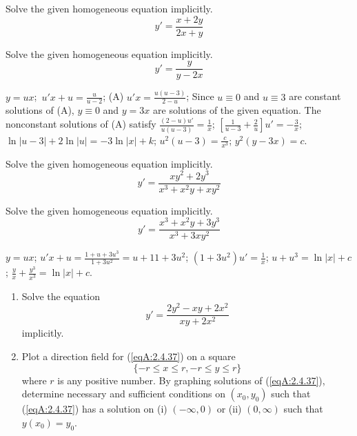\documentclass{ximera}
\begin{document}
\begin{problem}\label{exer:2.4.31}  Solve the given homogeneous equation implicitly.
$$y'=\frac{x+2y}{2x+y}$$
\end{problem}

\begin{problem}\label{exer:2.4.32}  Solve the given homogeneous equation implicitly.
$$y'=\frac{y}{y-2x}$$



\begin{solution}
    $y=ux$;\ $u'x+u=\frac{u}{ u-2}$;\;
(A)  $u'x=\frac{u(u-3)}{2-u}$;\;
Since $u\equiv0$ and $u\equiv3$
are constant solutions of (A), $y\equiv0$ and
$y=3x$ are solutions of the given equation.
The nonconstant solutions of (A) satisfy
$\frac{(2-u)u'}{ u(u-3)}=\frac{1}{ x}$;\;
$\left[\frac{1}{ u-3}+\frac{2}{
u}\right]u'=-\frac{3}{ x}$;\;
$\ln|u-3|+2\ln|u|=-3\ln|x|+k$;\;
$u^2(u-3)=\frac{c}{ x^3}$;\;
$y^2(y-3x)=c$.
\end{solution}
\end{problem}

\begin{problem}\label{exer:2.4.33} Solve the given homogeneous equation implicitly.
$$y'=\frac{xy^2+2y^3}{x^3+x^2y+xy^2}$$
\end{problem}

\begin{problem}\label{exer:2.4.34} Solve the given homogeneous equation implicitly.
$$y'=\frac{x^3+x^2y+3y^3}{x^3+3xy^2}$$



\begin{solution}
    $y=ux$;\;
$u'x+u=
\frac {1+u+3u^3 }{ 1+3u^2}=u+{1 }{ 1+3u^2}$;\;
$(1+3u^2)u'=\frac{1}{ x}$;\;
$u+u^3=\ln |x|+c$;\;
$\frac{y}{ x}+\frac{y^3}{ x^3}=\ln |x|+c$.
\end{solution}
\end{problem}


\begin{problem}\label{exer:2.4.37}
\begin{enumerate}
\item %
Solve the equation
\begin{equation}\label{eqA:2.4.37}
y'=\frac{2y^2-xy+2x^2}{xy+2x^2}
\end{equation}
implicitly.
\item %
Plot a direction field for (\ref{eqA:2.4.37}) on a square
$$
\{-r\leq x\leq r,-r\leq y\leq r\}
$$
where $r$ is any positive number. By graphing solutions of (\ref{eqA:2.4.37}),
determine necessary and sufficient conditions on $(x_0,y_0)$ such that
(\ref{eqA:2.4.37}) has a solution on (i) $(-\infty,0)$ or (ii) $(0,\infty)$ such that
$y(x_0)=y_0$.
\end{enumerate}
\end{problem}
\end{document}

